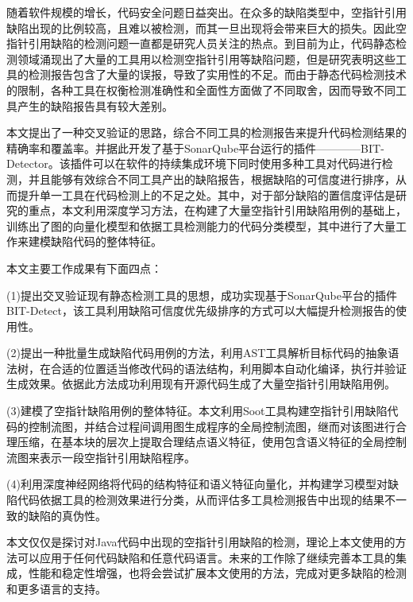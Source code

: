 

\begin{conclusion}

随着软件规模的增长，代码安全问题日益突出。在众多的缺陷类型中，空指针引用缺陷出现的比例较高，且难以被检测，而其一旦出现将会带来巨大的损失。因此空指针引用缺陷的检测问题一直都是研究人员关注的热点。到目前为止，代码静态检测领域涌现出了大量的工具用以检测空指针引用等缺陷问题，但是研究表明这些工具的检测报告包含了大量的误报，导致了实用性的不足。而由于静态代码检测技术的限制，各种工具在权衡检测准确性和全面性方面做了不同取舍，因而导致不同工具产生的缺陷报告具有较大差别。

本文提出了一种交叉验证的思路，综合不同工具的检测报告来提升代码检测结果的精确率和覆盖率。并据此开发了基于SonarQube平台运行的插件————BIT-Detector。该插件可以在软件的持续集成环境下同时使用多种工具对代码进行检测，并且能够有效综合不同工具产出的缺陷报告，根据缺陷的可信度进行排序，从而提升单一工具在代码检测上的不足之处。其中，对于部分缺陷的置信度评估是研究的重点，本文利用深度学习方法，在构建了大量空指针引用缺陷用例的基础上，训练出了图的向量化模型和依据工具检测能力的代码分类模型，其中进行了大量工作来建模缺陷代码的整体特征。

本文主要工作成果有下面四点：

(1)提出交叉验证现有静态检测工具的思想，成功实现基于SonarQube平台的插件BIT-Detect，该工具利用缺陷可信度优先级排序的方式可以大幅提升检测报告的使用性。

(2)提出一种批量生成缺陷代码用例的方法，利用AST工具解析目标代码的抽象语法树，在合适的位置适当修改代码的语法结构，利用脚本自动化编译，执行并验证生成效果。依据此方法成功利用现有开源代码生成了大量空指针引用缺陷用例。

(3)建模了空指针缺陷用例的整体特征。本文利用Soot工具构建空指针引用缺陷代码的控制流图，并结合过程间调用图生成程序的全局控制流图，继而对该图进行合理压缩，在基本块的层次上提取合理结点语义特征，使用包含语义特征的全局控制流图来表示一段空指针引用缺陷程序。

(4)利用深度神经网络将代码的结构特征和语义特征向量化，并构建学习模型对缺陷代码依据工具的检测效果进行分类，从而评估多工具检测报告中出现的结果不一致的缺陷的真伪性。

本文仅仅是探讨对Java代码中出现的空指针引用缺陷的检测，理论上本文使用的方法可以应用于任何代码缺陷和任意代码语言。未来的工作除了继续完善本工具的集成，性能和稳定性增强，也将会尝试扩展本文使用的方法，完成对更多缺陷的检测和更多语言的支持。

\end{conclusion}